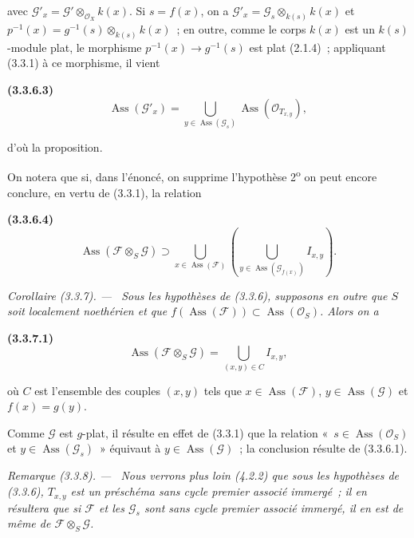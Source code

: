 \documentclass[10pt,oneside]{book}
\newenvironment{env}[1][]{\par\medskip\noindent\textbf{(#1)}\ }{\par}
\newenvironment{corollary}[1][]{%
  \par\medskip\noindent\itshape Corollaire (#1). ---\ }{\par}
\newenvironment{remark}[1][]{%
  \par\medskip\noindent\itshape Remarque (#1). ---\ }{\par}
\begin{document}
avec $\mathcal G'_x=\mathcal G'\otimes_{\mathcal O_X}k(x)$. Si $s=f(x)$, on a
$\mathcal G'_x=\mathcal G_s\otimes_{k(s)}k(x)$ et
$p^{-1}(x)=g^{-1}(s)\otimes_{k(s)}k(x)$~; en outre, comme le corps $k(x)$ est
un $k(s)$-module plat, le morphisme
$p^{-1}(x)\to g^{-1}(s)$ est plat (2.1.4)~; appliquant (3.3.1) à ce morphisme,
il vient

\begin{env}[3.3.6.3]
\label{IV.2.3.3.6.3-fr}
\[
\operatorname{Ass}(\mathcal G'_x)
=\bigcup_{y\in\operatorname{Ass}(\mathcal G_s)}
\operatorname{Ass}(\mathcal O_{T_{x,y}}),
\]
\end{env}

d'où la proposition.

On notera que si, dans l'énoncé, on supprime l'hypothèse
2\textsuperscript{o} on peut encore conclure, en vertu de (3.3.1), la relation

\begin{env}[3.3.6.4]
\label{IV.2.3.3.6.4-fr}
\[
\operatorname{Ass}(\mathcal F\otimes_S\mathcal G)
\supset\bigcup_{x\in\operatorname{Ass}(\mathcal F)}
\left(\bigcup_{y\in\operatorname{Ass}(\mathcal G_{f(x)})}I_{x,y}\right).
\]
\end{env}

\begin{corollary}[3.3.7]
\label{IV.2.3.3.7-fr}
Sous les hypothèses de (3.3.6), supposons en outre que $S$ soit localement
noethérien et que
$f(\operatorname{Ass}(\mathcal F))\subset\operatorname{Ass}(\mathcal O_S)$.
Alors on a
\end{corollary}

\begin{env}[3.3.7.1]
\label{IV.2.3.3.7.1-fr}
\[
\operatorname{Ass}(\mathcal F\otimes_S\mathcal G)
=\bigcup_{(x,y)\in C}I_{x,y},
\]
\end{env}

où $C$ est l'ensemble des couples $(x,y)$ tels que
$x\in\operatorname{Ass}(\mathcal F)$, $y\in\operatorname{Ass}(\mathcal G)$ et
$f(x)=g(y)$.

Comme $\mathcal G$ est $g$-plat, il résulte en effet de (3.3.1) que la relation
«~$s\in\operatorname{Ass}(\mathcal O_S)$ et
$y\in\operatorname{Ass}(\mathcal G_s)$~» équivaut à
$y\in\operatorname{Ass}(\mathcal G)$~; la conclusion résulte de (3.3.6.1).

\begin{remark}[3.3.8]
\label{IV.2.3.3.8-fr}
Nous verrons plus loin (4.2.2) que sous les hypothèses de (3.3.6),
$T_{x,y}$ est un préschéma \emph{sans cycle premier associé immergé}~; il en
résultera que si $\mathcal F$ et les $\mathcal G_s$ sont sans cycle premier
associé immergé, il en est de même de $\mathcal F\otimes_S\mathcal G$.
\end{remark}
\end{document}
